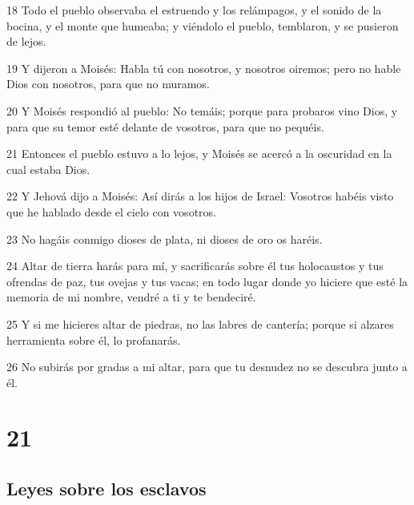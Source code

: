 \par 18 Todo el pueblo observaba el estruendo y los relámpagos, y el sonido de la bocina, y el monte que humeaba; y viéndolo el pueblo, temblaron, y se pusieron de lejos.
\par 19 Y dijeron a Moisés: Habla tú con nosotros, y nosotros oiremos; pero no hable Dios con nosotros, para que no muramos.
\par 20 Y Moisés respondió al pueblo: No temáis; porque para probaros vino Dios, y para que su temor esté delante de vosotros, para que no pequéis.
\par 21 Entonces el pueblo estuvo a lo lejos, y Moisés se acercó a la oscuridad en la cual estaba Dios.
\par 22 Y Jehová dijo a Moisés: Así dirás a los hijos de Israel: Vosotros habéis visto que he hablado desde el cielo con vosotros.
\par 23 No hagáis conmigo dioses de plata, ni dioses de oro os haréis.
\par 24 Altar de tierra harás para mí, y sacrificarás sobre él tus holocaustos y tus ofrendas de paz, tus ovejas y tus vacas; en todo lugar donde yo hiciere que esté la memoria de mi nombre, vendré a ti y te bendeciré.
\par 25 Y si me hicieres altar de piedras, no las labres de cantería; porque si alzares herramienta sobre él, lo profanarás.
\par 26 No subirás por gradas a mi altar, para que tu desnudez no se descubra junto a él.

\chapter{21}

\section*{Leyes sobre los esclavos}

